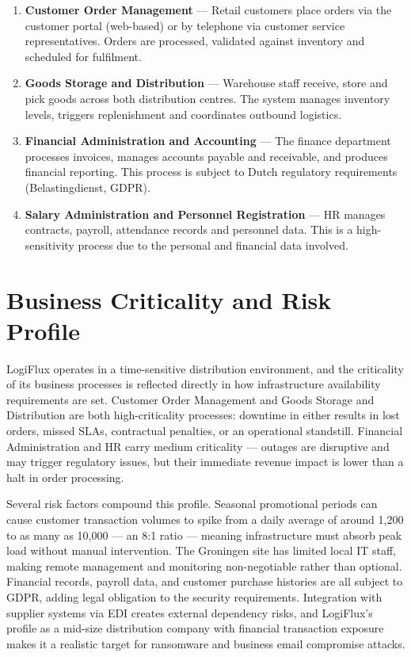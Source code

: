 \begin{enumerate}
    \item \textbf{Customer Order Management} --- Retail customers place orders via the customer portal (web-based) or by telephone via customer service representatives. Orders are processed, validated against inventory and scheduled for fulfilment.

    \item \textbf{Goods Storage and Distribution} --- Warehouse staff receive, store and pick goods across both distribution centres. The system manages inventory levels, triggers replenishment and coordinates outbound logistics.

    \item \textbf{Financial Administration and Accounting} --- The finance department processes invoices, manages accounts payable and receivable, and produces financial reporting. This process is subject to Dutch regulatory requirements (Belastingdienst, GDPR).

    \item \textbf{Salary Administration and Personnel Registration} --- HR manages contracts, payroll, attendance records and personnel data. This is a high-sensitivity process due to the personal and financial data involved.
\end{enumerate}

\section{Business Criticality and Risk Profile}

LogiFlux operates in a time-sensitive distribution environment, and the criticality of its business processes is reflected directly in how infrastructure availability requirements are set. \label{tab:criticality}Customer Order Management and Goods Storage and Distribution are both high-criticality processes: downtime in either results in lost orders, missed SLAs, contractual penalties, or an operational standstill. Financial Administration and HR carry medium criticality --- outages are disruptive and may trigger regulatory issues, but their immediate revenue impact is lower than a halt in order processing.

Several risk factors compound this profile. Seasonal promotional periods can cause customer transaction volumes to spike from a daily average of around 1{,}200 to as many as 10{,}000 --- an 8:1 ratio --- meaning infrastructure must absorb peak load without manual intervention. The Groningen site has limited local IT staff, making remote management and monitoring non-negotiable rather than optional. Financial records, payroll data, and customer purchase histories are all subject to GDPR, adding legal obligation to the security requirements. Integration with supplier systems via EDI creates external dependency risks, and LogiFlux's profile as a mid-size distribution company with financial transaction exposure makes it a realistic target for ransomware and business email compromise attacks.

